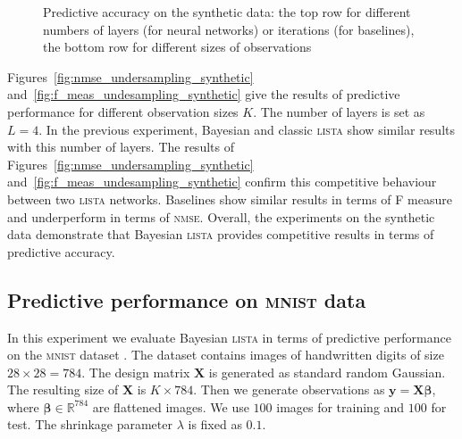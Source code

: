 \documentclass{article}
\begin{document}
\begin{figure}[h]
  \caption{Predictive accuracy on the synthetic data: the top row for different numbers of layers (for neural networks) or iterations (for baselines),  the bottom row for different sizes of observations}
  \label{fig:number_of_layers_synthetic}
  \end{figure}
  
  Figures~\ref{fig:nmse_undersampling_synthetic} and~\ref{fig:f_meas_undesampling_synthetic} give the results of predictive performance for different observation sizes $K$. The number of layers is set as $L=4$. In the previous experiment, Bayesian and classic \textsc{lista} show similar results with this number of layers. The results of Figures~\ref{fig:nmse_undersampling_synthetic} and~\ref{fig:f_meas_undesampling_synthetic} confirm this competitive behaviour between two \textsc{lista} networks. Baselines show similar results in terms of F measure and underperform in terms of \textsc{nmse}. Overall, the experiments on the synthetic data demonstrate that Bayesian \textsc{lista} provides competitive results in terms of predictive accuracy.
  
  
  
  \subsection{Predictive performance on \textsc{mnist} data}
  In this experiment we evaluate Bayesian \textsc{lista} in terms of predictive performance on the \textsc{mnist} dataset \cite{lecun1998gradient}. The dataset contains images of handwritten digits of size $28 \times 28 = 784$. The design matrix $\mathbf{X}$ is generated as standard random Gaussian. The resulting size of $\mathbf{X}$ is $K \times 784$. Then we generate observations as $\mathbf{y} = \mathbf{X}\boldsymbol\beta$, where $\boldsymbol\beta \in \mathbb{R}^{784}$ are flattened images. We use $100$ images for training and $100$ for test. The shrinkage parameter $\lambda$ is fixed as $0.1$.
  
\end{document}
